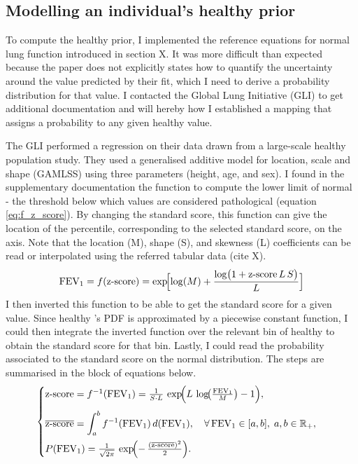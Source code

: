 \subsection{Modelling an individual's healthy \F prior}
To compute the healthy \F prior, I implemented the reference equations for normal lung function introduced in section X.  It was more difficult than expected because the paper does not explicitly states how to quantify the uncertainty around the \F value predicted by their fit, which I need to derive a probability distribution for that \F value.  I contacted the Global Lung Initiative (GLI) to get additional documentation and will hereby how I established a mapping that assigns a probability to any given healthy \F value.

The GLI performed a regression on their \F data drawn from a large-scale healthy population study. They used a generalised additive model for location, scale and shape (GAMLSS) using three parameters (height, age, and sex). I found in the supplementary documentation the function to compute the lower limit of normal - the threshold below which \F values are considered pathological (equation \ref{eq:f_z_score}). By changing the standard score, this function can give the location of the percentile, corresponding to the selected standard score, on the \F axis. Note that the location (M), shape (S), and skewness (L) coefficients can be read or interpolated using the referred tabular data (cite X).
\begin{equation} \label{eq:f_z_score}
        \mathrm{FEV}_1 = f(\text{z-score}) 
    = \exp\!\Bigl[\log(M) +\frac{\log\bigl(1 + \text{z-score}\,L \, S \bigr)}{L}\Bigr]
\end{equation}
I then inverted this function to be able to get the standard score for a given \F value. Since healthy \F's PDF is approximated by a piecewise constant function, I could then integrate the inverted function over the relevant bin of healthy \F to obtain the  standard score for that bin. Lastly, I could read the probability associated to the standard score on the normal distribution. The steps are summarised in the block of equations below.
\begin{equation}
\begin{cases}
    \text{z-score} = f^{-1}(\mathrm{FEV}_1) 
    = \frac{1}{S \cdot L}\,\exp\!\Bigl(L\,\log\!\bigl(\tfrac{\mathrm{FEV}_1}{M}\bigr)- 1\Bigr),\\[1em]
    \overline{\text{z-score}} 
    =  \displaystyle \int_{a}^{b} f^{-1}(\mathrm{FEV}_1)\,d(\mathrm{FEV}_1),
    \quad \forall\,\mathrm{FEV}_1 \in [a,b],\; a,b \in \mathbb{R}_+,\\[1em]
    P(\mathrm{FEV}_1)
    = \frac{1}{\sqrt{2\pi}} \,\exp\!\Bigl(-\,\tfrac{(\overline{\text{z-score}} )^2}{2}\Bigr).
\end{cases}
\end{equation}


